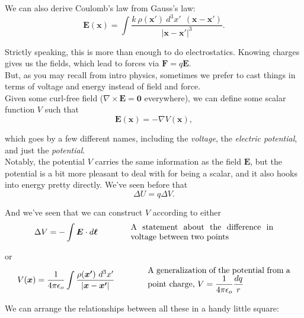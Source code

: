 \documentclass{article}
\numberwithin{equation}{section}
\begin{document}
We can also derive Coulomb's law from Gauss's law:
\begin{equation*}
    \bm{E}(\bm{x}) = \int \frac{k\ \rho(\bm{x'})\ d^3x'\ \ \left( \bm{x} - \bm{x'} \right)}{\left| \bm{x} - \bm{x'} \right|^3}.
\end{equation*}

Strictly speaking, this is more than enough to do electrostatics. Knowing charges gives us the fields, which lead to forces via $\displaystyle \bm{F} = q\bm{E}$. \\

But, as you may recall from intro physics, sometimes we prefer to cast things in terms of voltage and energy instead of field and force. \\

Given some curl-free field ($\nabla \times \bm{E} = \bm{0}$ everywhere), we can define some scalar function $V$ such that
\begin{equation*}
    \bm{E}(\bm{x}) = -\nabla V (\bm{x}),
\end{equation*}

which goes by a few different names, including the \emph{voltage}, the \emph{electric potential}, and just the \emph{potential}. \\

Notably, the potential $V$ carries the same information as the field $\bm{E}$, but the potential is a bit more pleasant to deal with for being a scalar, and it also hooks into energy pretty directly. We've seen before that
\begin{equation*}
    \Delta U = q \Delta V.
\end{equation*}

And we've seen that we can construct $V$ according to either
\begin{equation*}
    \Delta V = -\int \bm{E} \cdot d\bm{\ell} \qquad\qquad \parbox[c]{0.5\textwidth}{A statement about the difference in voltage between two points}
\end{equation*}

or
\begin{equation*}
    V(\bm{x}) = \frac{1}{4\pi\epsilon_o} \int \frac{\rho(\bm{x'})\ d^3x'}{\left| \bm{x} - \bm{x'} \right|} \qquad\qquad \parbox[c]{0.5\textwidth}{A generalization of the potential from a point charge, $\displaystyle V = \frac{1}{4\pi\epsilon_o} \frac{dq}{r}$}
\end{equation*}

We can arrange the relationships between all these in a handy little square:
\end{document}
